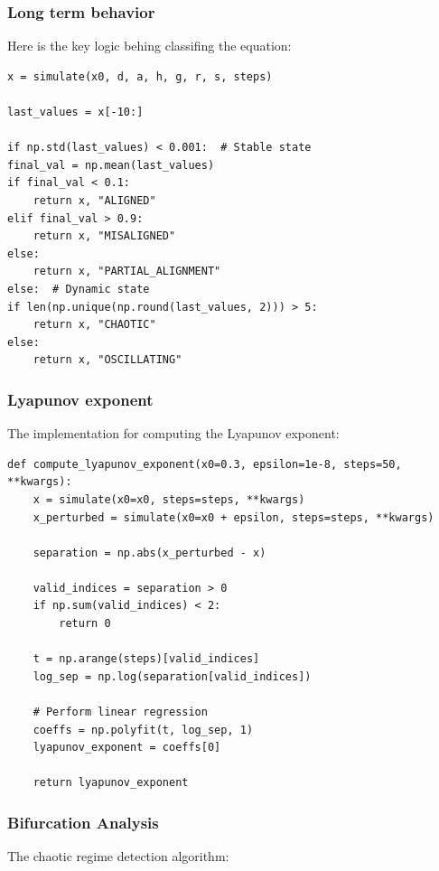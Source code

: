 \documentclass[a4paper, 10pt]{article}
\begin{document}
\subsubsection{Long term behavior}
Here is the key logic behing classifing the equation:

\begin{verbatim}
x = simulate(x0, d, a, h, g, r, s, steps)

last_values = x[-10:]

if np.std(last_values) < 0.001:  # Stable state
final_val = np.mean(last_values)
if final_val < 0.1:
    return x, "ALIGNED"
elif final_val > 0.9:
    return x, "MISALIGNED"
else:
    return x, "PARTIAL_ALIGNMENT"
else:  # Dynamic state
if len(np.unique(np.round(last_values, 2))) > 5:
    return x, "CHAOTIC"
else:
    return x, "OSCILLATING"
\end{verbatim}
\vspace{-3em}

\subsubsection{Lyapunov exponent}
The implementation for computing the Lyapunov exponent:

\begin{verbatim}
def compute_lyapunov_exponent(x0=0.3, epsilon=1e-8, steps=50, **kwargs):
    x = simulate(x0=x0, steps=steps, **kwargs)
    x_perturbed = simulate(x0=x0 + epsilon, steps=steps, **kwargs)

    separation = np.abs(x_perturbed - x)

    valid_indices = separation > 0
    if np.sum(valid_indices) < 2:
        return 0

    t = np.arange(steps)[valid_indices]
    log_sep = np.log(separation[valid_indices])

    # Perform linear regression
    coeffs = np.polyfit(t, log_sep, 1)
    lyapunov_exponent = coeffs[0]

    return lyapunov_exponent
\end{verbatim}
\vspace{-3em}

\subsubsection{Bifurcation Analysis}
The chaotic regime detection algorithm:
\end{document}

